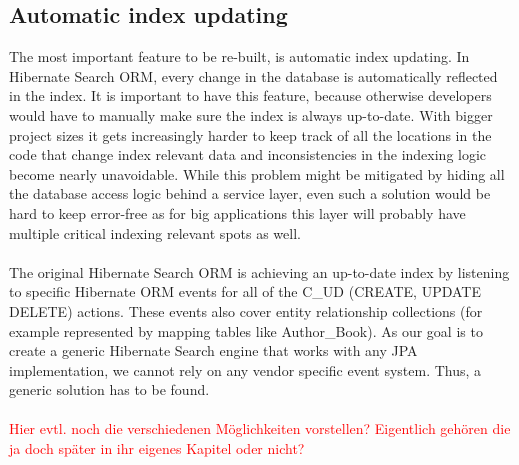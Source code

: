 \subsection{Automatic index updating}
The most important feature to be re-built, is automatic index updating. In Hibernate Search ORM, every change in the database is automatically reflected in the index. It is important to have this feature, because otherwise developers would have to manually make sure the index is always up-to-date. With bigger project sizes it gets increasingly harder to keep track of all the locations in the code that change index relevant data and inconsistencies in the indexing logic become nearly unavoidable. While this problem might be mitigated by hiding all the database access logic behind a service layer, even such a solution would be hard to keep error-free as for big applications this layer will probably have multiple critical indexing relevant spots as well.
\\\\
The original Hibernate Search ORM is achieving an up-to-date index by listening to specific Hibernate ORM events for all of the C\_UD (CREATE, UPDATE DELETE) actions. These events also cover entity relationship collections (for example represented by mapping tables like Author\_Book). As our goal is to create a generic Hibernate Search engine that works with any JPA implementation, we cannot rely on any vendor specific event system. Thus, a generic solution has to be found.
\\\\
\textcolor{red}{Hier evtl. noch die verschiedenen Möglichkeiten vorstellen? Eigentlich gehören die ja doch später in ihr eigenes Kapitel oder nicht?}

\pagebreak